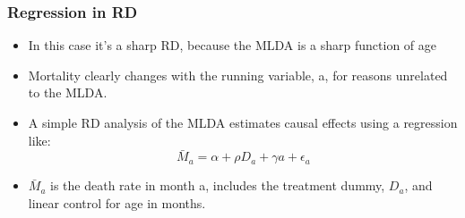 \documentclass{beamer}
\begin{document}
\begin{frame}
\frametitle{Regression in RD}
\begin{itemize}
	\item In this case it’s a sharp RD, because the MLDA is a sharp function of age
	\item Mortality clearly changes with the running variable, a, for reasons unrelated to the MLDA.
	\item A simple RD analysis of the MLDA estimates causal effects using a regression like: 
	$$\bar{M}_a=\alpha + \rho D_a + \gamma a + \epsilon_a$$
	\item $\bar{M}_a$ is the death rate in month a, includes the treatment dummy, $D_a$, and linear control for age in months.
\end{itemize}
\end{frame}
\end{document}
